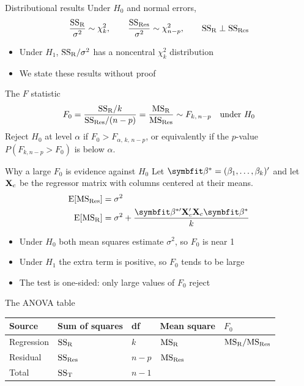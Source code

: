 \begin{frame}{Distributional results}
    Under $H_0$ and normal errors,
    \begin{align*}
        \frac{\mathrm{SS}_{\mathrm{R}}}{\sigma^2} \sim \chi^2_k, \qquad \frac{\mathrm{SS}_{\mathrm{Res}}}{\sigma^2} \sim \chi^2_{n-p}, \qquad \mathrm{SS}_{\mathrm{R}} \perp \mathrm{SS}_{\mathrm{Res}}
    \end{align*}
    \begin{itemize}
        \item Under $H_1$, $\mathrm{SS}_{\mathrm{R}}/\sigma^2$ has a noncentral $\chi^2_k$ distribution
        \item We state these results without proof
    \end{itemize}
\end{frame}


\begin{frame}{The $F$ statistic}
    \begin{align*}
        F_0 = \frac{\mathrm{SS}_{\mathrm{R}}/k}{\mathrm{SS}_{\mathrm{Res}}/(n-p)} = \frac{\mathrm{MS}_{\mathrm{R}}}{\mathrm{MS}_{\mathrm{Res}}} \sim F_{k,\,n-p} \quad \text{under } H_0
    \end{align*}
    Reject $H_0$ at level $\alpha$ if $F_0 > F_{\alpha,\,k,\,n-p}$, or equivalently if the $p$-value $P(F_{k,n-p} > F_0)$ is below $\alpha$.
\end{frame}


\begin{frame}{Why a large $F_0$ is evidence against $H_0$}
    Let $\bbeta^* = (\beta_1,\dots,\beta_k)'$ and let $\mathbf{X}_c$ be the regressor matrix with columns centered at their means.
    \begin{align*}
        \E[\MSRes] &= \sigma^2 \\
        \E[\MSR] &= \sigma^2 + \frac{\bbeta^{*\prime}\bX_c'\bX_c\bbeta^*}{k}
    \end{align*}
    \begin{itemize}
        \item Under $H_0$ both mean squares estimate $\sigma^2$, so $F_0$ is near 1
        \item Under $H_1$ the extra term is positive, so $F_0$ tends to be large
        \item The test is one-sided: only large values of $F_0$ reject
    \end{itemize}
\end{frame}


\begin{frame}{The ANOVA table}
    \begin{center}
        \begin{tabular}{lllll}
            \toprule
            Source & Sum of squares & df & Mean square & $F_0$ \\
            \midrule
            Regression & $\mathrm{SS}_{\mathrm{R}}$ & $k$ & $\mathrm{MS}_{\mathrm{R}}$ & $\mathrm{MS}_{\mathrm{R}}/\mathrm{MS}_{\mathrm{Res}}$ \\
            Residual & $\mathrm{SS}_{\mathrm{Res}}$ & $n-p$ & $\mathrm{MS}_{\mathrm{Res}}$ & \\
            Total & $\mathrm{SS}_{\mathrm{T}}$ & $n-1$ & & \\
            \bottomrule
        \end{tabular}
    \end{center}
\end{frame}


